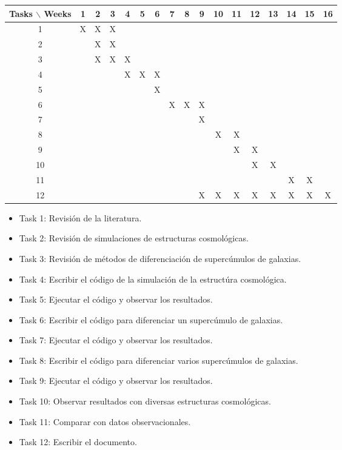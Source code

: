 \documentclass[12pt]{article}
\begin{document}
\begin{table}[htb]
	\begin{tabular}{|c|cccccccccccccccc| }
	\hline
	Tasks $\backslash$ Weeks & 1 & 2 & 3 & 4 & 5 & 6 & 7 & 8 & 9 & 10 & 11 & 12 & 13 & 14 & 15 & 16  \\
	\hline
	1 & X & X & X &   &   &   &   &   &   &   &   &   &   &   &   &   \\
	2 &   & X & X &   &   &   &   &   &   &   &   &   &   &   &   &   \\
	3 &   & X & X & X &   &   &   &   &   &   &   &   &   &   &   &   \\
	4 &   &   &   & X & X & X &   &   &   &   &   &   &   &   &   &   \\
	5 &   &   &   &   &   & X &   &   &   &   &   &   &   &   &   &   \\
	6 &   &   &   &   &   &   & X & X & X &   &   &   &   &   &   &   \\
	7 &   &   &   &   &   &   &   &   & X &   &   &   &   &   &   &   \\
	8 &   &   &   &   &   &   &   &   &   & X & X &   &   &   &   &   \\
	9 &   &   &   &   &   &   &   &   &   &   & X & X &   &   &   &   \\
	10 &  &   &   &   &   &   &   &   &   &   &   & X & X &   &   &   \\
	11 &  &   &   &   &   &   &   &   &   &   &   &   &   & X & X &   \\
	12 &  &   &   &   &   &   &   &   & X & X & X & X & X & X & X & X \\
	\hline
	\end{tabular}
\end{table}
\vspace{1mm}

\begin{itemize}
	\item Task 1: Revisi\'{o}n de la literatura. 
	\item Task 2: Revisi\'{o}n de simulaciones de estructuras cosmol\'{o}gicas.
	\item Task 3: Revisi\'{o}n de m\'{e}todos de diferenciaci\'{o}n de superc\'{u}mulos de galaxias.
	\item Task 4: Escribir el c\'{o}digo de la simulaci\'{o}n de la estruct\'{u}ra cosmol\'{o}gica. 
	\item Task 5: Ejecutar el c\'{o}digo y observar los resultados.
	\item Task 6: Escribir el c\'{o}digo para diferenciar un superc\'{u}mulo de galaxias. 
	\item Task 7: Ejecutar el c\'{o}digo y observar los resultados.
	\item Task 8: Escribir el c\'{o}digo para diferenciar varios superc\'{u}mulos de galaxias. 
	\item Task 9: Ejecutar el c\'{o}digo y observar los resultados.
	\item Task 10: Observar resultados con diversas estructuras cosmol\'{o}gicas.
	\item Task 11: Comparar con datos observacionales.
	\item Task 12: Escribir el documento.
\end{itemize}
\end{document}
